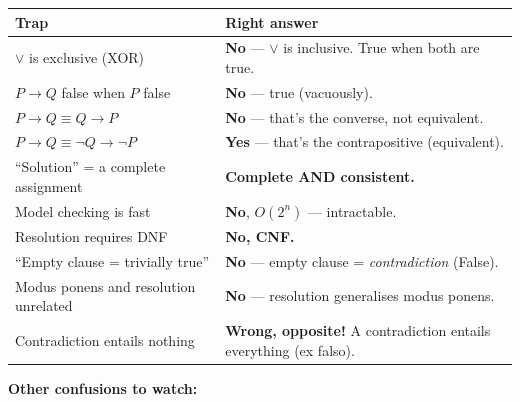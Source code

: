 \documentclass[11pt, a4paper]{article}
\newcommand{\thead}[1]{\textbf{#1}}
\begin{document}
\begin{trapbox}[summary]
\begin{tabular}{@{}p{6.5cm}p{8cm}@{}}
\toprule
\thead{Trap} & \thead{Right answer} \\
\midrule
$\lor$ is exclusive (XOR)             & \textbf{No} — $\lor$ is inclusive. True when both are true. \\
$P \rightarrow Q$ false when $P$ false  & \textbf{No} — true (vacuously). \\
$P \rightarrow Q \equiv Q \rightarrow P$ & \textbf{No} — that's the converse, not equivalent. \\
$P \rightarrow Q \equiv \neg Q \rightarrow \neg P$ & \textbf{Yes} — that's the contrapositive (equivalent). \\
``Solution'' = a complete assignment   & \textbf{Complete AND consistent.} \\
Model checking is fast                  & \textbf{No}, $O(2^n)$ — intractable. \\
Resolution requires DNF                 & \textbf{No, CNF.} \\
``Empty clause = trivially true''       & \textbf{No} — empty clause = \emph{contradiction} (False). \\
Modus ponens and resolution unrelated   & \textbf{No} — resolution generalises modus ponens. \\
Contradiction entails nothing           & \textbf{Wrong, opposite!} A contradiction entails everything (ex falso). \\
\bottomrule
\end{tabular}
\end{trapbox}

\textbf{Other confusions to watch:}
\end{document}
